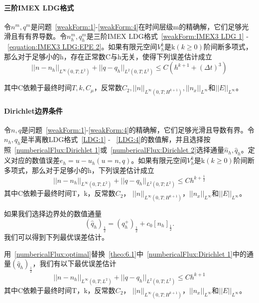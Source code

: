 \paragraph{三阶IMEX LDG格式}
\begin{theorem}
    令$n^m,q^m$是问题~\eqref{weakForm:1}-\eqref{weakForm:4}在时间层级m的精确解，它们足够光滑且有有界导数。令$n_h^m,q_h^m$是三阶IMEX LDG格式~\eqref{weakForm:IMEX3 LDG 1} - ~\eqref{equation:IMEX3 LDG:EPE 2}。如果有限元空间$V_h^k$是k$(k\geq  0)$阶间断多项式，那么对于足够小的h，存在正常数C与h无关，使得下列误差估计成立
    \begin{equation}
        ||n-n_h||_{L^{\infty}(0,T;L^2)} + ||q - q_h||_{L^2(0,T;L^2)} \leq C(h^{k+1} + (\Delta t)^3)
    \end{equation}
\end{theorem}
其中C依赖于最终时间$T,k,C_{\mu}$，反常数$C_2, ||n||_{L^{\infty}(0,T;H^{k+1})}, ||n_x||_{L^{\infty}}$和$||E||_{L^{\infty}}$。

\paragraph{Dirichlet边界条件}
\begin{lemma}\label{theo:6.1}
    令$n,q$是问题~\eqref{weakForm:1}-\eqref{weakForm:4}的精确解，它们足够光滑且导数有界。令$n_h,q_h$是半离散LDG格式~\eqref{LDG:1} - ~\eqref{LDG:4}的数值解，并且选择按照~\eqref{numbericalFlux:Dirichlet 1}或~\eqref{numbericalFlux:Dirichlet 2}选择通量$\hat{n}_h,\hat{q}_h$。定义对应的数值误差$e_h = u-u_h(u = n,q)$。如果有限元空间$V_h^k$是k$(k\geq  0)$阶间断多项式，那么对于足够小的h，下列误差估计成立
    \begin{equation}
        ||n-n_h||_{L^{\infty}(0,T;L^2)} + ||q - q_h||_{L^2(0,T;L^2)} \leq Ch^{k+\frac{1}{2}}
    \end{equation}
    其中C依赖于最终时间T，k，反常数$C_2$， $||n||_{L^{\infty}(0,T;H^{k+1})}$，$||n_x||_{L^{\infty}}$和$||E||_{L^{\infty}}$。
\end{lemma}
如果我们选择边界处的数值通量
\begin{equation}
    (\hat{q}_h)_{\frac{1}{2}} = (q_h^+)_{\frac{1}{2}} + c_0[n_h]_{\frac{1}{2}}. \label{numbericalFlux:optimal}
\end{equation}
我们可以得到下列最优误差估计。
\begin{theorem}
    用~\eqref{numbericalFlux:optimal}替换~\cref{theo:6.1}中~\eqref{numbericalFlux:Dirichlet 1}中的通量$(\hat{q}_h)_{\frac{1}{2}}$，我们有以下最优误差估计
    \begin{equation}
        ||n-n_h||_{L^{\infty}(0,T;L^2)} + ||q - q_h||_{L^2(0,T;L^2)} \leq C h^{k+1}
    \end{equation}
    其中C依赖于最终时间T，k，反常数$C_2$， $||n||_{L^{\infty}(0,T;H^{k+1})}$，$||n_x||_{L^{\infty}}$和$||E||_{L^{\infty}}$。
\end{theorem}
